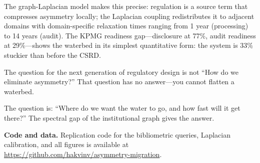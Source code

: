 \documentclass[12pt,a4paper]{article}
\begin{document}
The graph-Laplacian model makes this precise: regulation is a source term that compresses asymmetry locally; the Laplacian coupling redistributes it to adjacent domains with domain-specific relaxation times ranging from 1 year (processing) to 14 years (audit). The KPMG readiness gap---disclosure at 77\%, audit readiness at 29\%---shows the waterbed in its simplest quantitative form: the system is 33\% stuckier than before the CSRD.

The question for the next generation of regulatory design is not ``How do we eliminate asymmetry?'' That question has no answer---you cannot flatten a waterbed.

The question is: ``Where do we want the water to go, and how fast will it get there?'' The spectral gap of the institutional graph gives the answer.

\textbf{Code and data.} Replication code for the bibliometric queries, Laplacian calibration, and all figures is available at \url{https://github.com/hakvinv/asymmetry-migration}.
\end{document}
